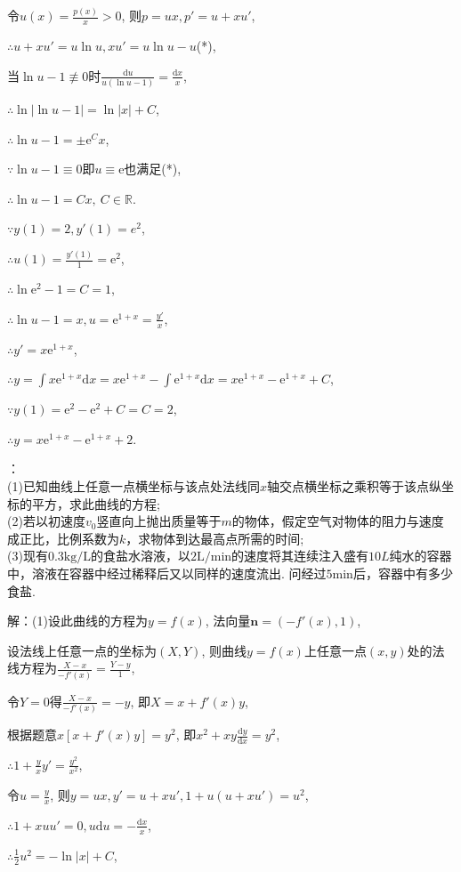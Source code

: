 \documentclass[12pt,UTF8,fleqn]{ctexart}
\newcommand{\md}[1]{\mathrm d#1}
\newcommand{\me}[0]{\mathrm e}
\begin{document}
\begin{enumerate}
令$u(x)=\frac{p(x)}x>0$, 则$p=ux,p'=u+xu'$,

$\therefore u+xu'=u\ln u, xu'=u\ln u-u$(*),

当$\ln u-1\not\equiv0$时$\frac{\md u}{u(\ln u-1)}=\frac{\md x}x$,

$\therefore\ln|\ln u-1|=\ln|x|+C$,

$\therefore\ln u-1=\pm\me^Cx$,

$\because\ln u-1\equiv0$即$u\equiv\me$也满足(*),

$\therefore\ln u-1=Cx,\ C\in\mathbb R$.

$\because y(1)=2,y'(1)=e^2$,

$\therefore u(1)=\frac{y'(1)}{1}=\me^2$,

$\therefore\ln\me^2-1=C=1$,

$\therefore\ln u-1=x, u=\me^{1+x}=\frac{y'}x$,

$\therefore y'=x\me^{1+x}$,

$\therefore y=\int x\me^{1+x}\md x=x\me^{1+x}-\int\me^{1+x}\md x=x\me^{1+x}-\me^{1+x}+C$,

$\because y(1)=\me^2-\me^2+C=C=2$,

$\therefore y=x\me^{1+x}-\me^{1+x}+2$.

：\\
(1)已知曲线上任意一点横坐标与该点处法线同$x$轴交点横坐标之乘积等于该点纵坐标的平方，求此曲线的方程;\\
(2)若以初速度$v_0$竖直向上抛出质量等于$m$的物体，假定空气对物体的阻力与速度成正比，比例系数为$k$，求物体到达最高点所需的时间;\\
(3)现有$0.3\text{kg/L}$的食盐水溶液，以$2\text{L/min}$的速度将其连续注入盛有$10L$纯水的容器中，溶液在容器中经过稀释后又以同样的速度流出. 问经过$5\text{min}$后，容器中有多少食盐.

解：(1)设此曲线的方程为$y=f(x)$, 法向量$\bm n=(-f'(x),1)$,

设法线上任意一点的坐标为$(X,Y)$, 则曲线$y=f(x)$上任意一点$(x,y)$处的法线方程为$\frac{X-x}{-f'(x)}=\frac{Y-y}1$,

令$Y=0$得$\frac{X-x}{-f'(x)}=-y$, 即$X=x+f'(x)y$,

根据题意$x[x+f'(x)y]=y^2$, 即$x^2+xy\frac{\md y}{\md x}=y^2$,

$\therefore1+\frac yxy'=\frac{y^2}{x^2}$,

令$u=\frac yx$, 则$y=ux,y'=u+xu', 1+u(u+xu')=u^2$,

$\therefore 1+xuu'=0, u\md u=-\frac{\md x}x$, 

$\therefore\frac12u^2=-\ln|x|+C$,


\end{enumerate}
\end{document}
